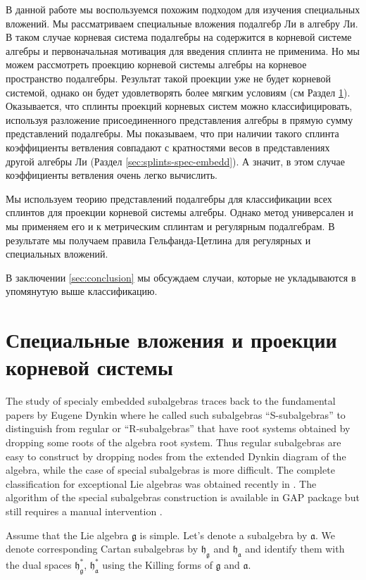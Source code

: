 \documentclass[12pt]{article}
\newcommand{\gf}{\mathfrak{g}}
\newcommand{\af}{\mathfrak{a}}
\newcommand{\hf}{\mathfrak{h}}
\newcommand{\hfg}{\hf_{\gf}}
\newcommand{\hfa}{\hf_{\af}}
\begin{document}
В данной работе мы воспользуемся похожим подходом для изучения специальных вложений. Мы
рассматриваем специальные вложения подалгебр Ли в алгебру Ли. В таком случае корневая система
подалгебры на содержится в корневой системе алгебры и первоначальная мотивация для введения сплинта
не применима. Но мы можем рассмотреть проекцию корневой системы алгебры на корневое пространство
подалгебры. Результат такой проекции уже не будет корневой системой, однако он будет удовлетворять
более мягким условиям (см Раздел \ref{sec:spec-embedd-proj}). Оказывается, что сплинты проекций
корневых систем можно классифицировать, используя разложение присоединенного представления алгебры
в прямую сумму представлений подалгебры. Мы показываем, что при наличии такого сплинта коэффициенты
ветвления совпадают с кратностями весов в представлениях другой алгебры Ли (Раздел
\ref{sec:splints-spec-embedd}). А значит, в этом случае коэффициенты ветвления очень легко вычислить.

Мы используем теорию представлений подалгебры для классификации всех сплинтов для проекции корневой
системы алгебры. Однако метод универсален и мы применяем его и к метрическим сплинтам и регулярным
подалгебрам. В результате мы получаем правила Гельфанда-Цетлина для регулярных и специальных
вложений. 

В заключении \ref{sec:conclusion} мы обсуждаем случаи, которые не укладываются в упомянутую выше
классификацию.


\section{Специальные вложения и проекции корневой системы}
\label{sec:spec-embedd-proj}

The study of specialy embedded subalgebras traces back to the fundamental papers by Eugene Dynkin
\cite{dynkin1952semisimple,dynkin1952maximal} where he called such subalgebras ``S-subalgebras'' to
distinguish from regular or ``R-subalgebras'' that have root systems obtained by dropping some roots
of the algebra root system. Thus regular subalgebras are easy to construct by dropping nodes from
the extended Dynkin diagram of the algebra, while the case of special subalgebras is more difficult. The complete
classification for exceptional Lie algebras was obtained recently in \cite{minchenko2006semisimple}.
The algorithm of the special subalgebras construction is available in GAP package but still requires
a manual intervention \cite{de2011constructing}.  

Assume that the Lie algebra $\gf$ is simple. Let's denote a subalgebra by
$\af$. We denote corresponding Cartan subalgebras by $\hfg$ and $\hfa$ and identify them with the dual
spaces $\hfg^{*}$, $\hfa^{*}$ using the Killing forms of $\gf$ and $\af$.
\end{document}
